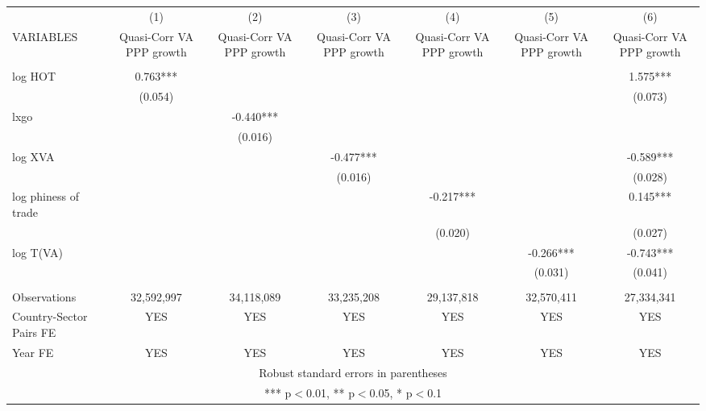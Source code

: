 \documentclass[]{article}
\begin{document}
\begin{tabular}{lcccccc} \hline
 & (1) & (2) & (3) & (4) & (5) & (6) \\
VARIABLES & Quasi-Corr VA PPP growth & Quasi-Corr VA PPP growth & Quasi-Corr VA PPP growth & Quasi-Corr VA PPP growth & Quasi-Corr VA PPP growth & Quasi-Corr VA PPP growth \\ \hline
 &  &  &  &  &  &  \\
log HOT & 0.763*** &  &  &  &  & 1.575*** \\
 & (0.054) &  &  &  &  & (0.073) \\
lxgo &  & -0.440*** &  &  &  &  \\
 &  & (0.016) &  &  &  &  \\
log XVA &  &  & -0.477*** &  &  & -0.589*** \\
 &  &  & (0.016) &  &  & (0.028) \\
log phiness of trade &  &  &  & -0.217*** &  & 0.145*** \\
 &  &  &  & (0.020) &  & (0.027) \\
log T(VA) &  &  &  &  & -0.266*** & -0.743*** \\
 &  &  &  &  & (0.031) & (0.041) \\
 &  &  &  &  &  &  \\
Observations & 32,592,997 & 34,118,089 & 33,235,208 & 29,137,818 & 32,570,411 & 27,334,341 \\
Country-Sector Pairs FE & YES & YES & YES & YES & YES & YES \\
 Year FE & YES & YES & YES & YES & YES & YES \\ \hline
\multicolumn{7}{c}{ Robust standard errors in parentheses} \\
\multicolumn{7}{c}{ *** p$<$0.01, ** p$<$0.05, * p$<$0.1} \\
\end{tabular}
\end{document}
